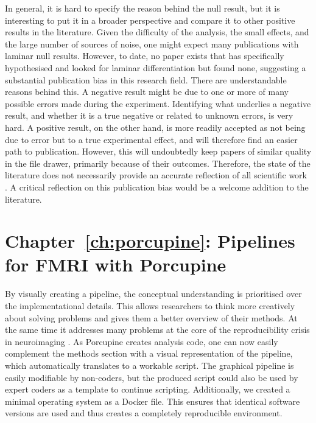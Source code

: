 In general, it is hard to specify the reason behind the null result, but it is interesting to put it in a broader perspective and compare it to other positive results in the literature. Given the difficulty of the analysis, the small effects, and the large number of sources of noise, one might expect many publications with laminar null results. However, to date, no paper exists that has specifically hypothesised and looked for laminar differentiation but found none, suggesting a substantial publication bias in this research field. There are understandable reasons behind this. A negative result might be due to one or more of many possible errors made during the experiment. Identifying what underlies a negative result, and whether it is a true negative or related to unknown errors, is very hard. A positive result, on the other hand, is more readily accepted as not being due to error but to a true experimental effect, and will therefore find an easier path to publication. However, this will undoubtedly keep papers of similar quality in the file drawer, primarily because of their outcomes. Therefore, the state of the literature does not necessarily provide an accurate reflection of all scientific work \cite{Ioannidis2005,Button2013}. A critical reflection on this publication bias would be a welcome addition to the literature.

\section*{Chapter~\ref{ch:porcupine}: Pipelines for FMRI with Porcupine}
By visually creating a pipeline, the conceptual understanding is prioritised over the implementational details. This allows researchers to think more creatively about solving problems and gives them a better overview of their methods. At the same time it addresses many problems at the core of the reproducibility crisis in neuroimaging \cite{Nature2017,Munafo2017}. As Porcupine creates analysis code, one can now easily complement the methods section with a visual representation of the pipeline, which automatically translates to a workable script. The graphical pipeline is easily modifiable by non-coders, but the produced script could also be used by expert coders as a template to continue scripting. Additionally, we created a minimal operating system as a Docker file. This ensures that identical software versions are used and thus creates a completely reproducible environment.

